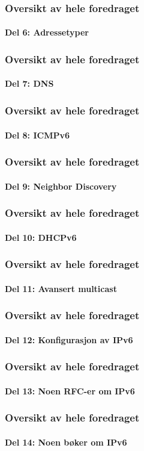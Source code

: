 \begin{frame}%
  \frametitle{Oversikt av hele foredraget}
  \framesubtitle{Del 6: Adressetyper}
  \tableofcontents[part=6]%
\end{frame}

\begin{frame}%
  \frametitle{Oversikt av hele foredraget}
  \framesubtitle{Del 7: DNS}
  \tableofcontents[part=7]%
\end{frame}

\begin{frame}%
  \frametitle{Oversikt av hele foredraget}
  \framesubtitle{Del 8: ICMPv6}
  \tableofcontents[part=8]%
\end{frame}

\begin{frame}%
  \frametitle{Oversikt av hele foredraget}
  \framesubtitle{Del 9: Neighbor Discovery}
  \tableofcontents[part=9]%
\end{frame}

\begin{frame}%
  \frametitle{Oversikt av hele foredraget}
  \framesubtitle{Del 10: DHCPv6}
  \tableofcontents[part=10]%
\end{frame}

\begin{frame}%
  \frametitle{Oversikt av hele foredraget}
  \framesubtitle{Del 11: Avansert multicast}
  \tableofcontents[part=11]%
\end{frame}

\begin{frame}%
  \frametitle{Oversikt av hele foredraget}
  \framesubtitle{Del 12: Konfigurasjon av IPv6}
  \tableofcontents[part=12]%
\end{frame}

\begin{frame}%
  \frametitle{Oversikt av hele foredraget}
  \framesubtitle{Del 13: Noen RFC-er om IPv6}
  \tableofcontents[part=13]%
\end{frame}

\begin{frame}%
  \frametitle{Oversikt av hele foredraget}
  \framesubtitle{Del 14: Noen bøker om IPv6}
  \tableofcontents[part=14]%
\end{frame}

